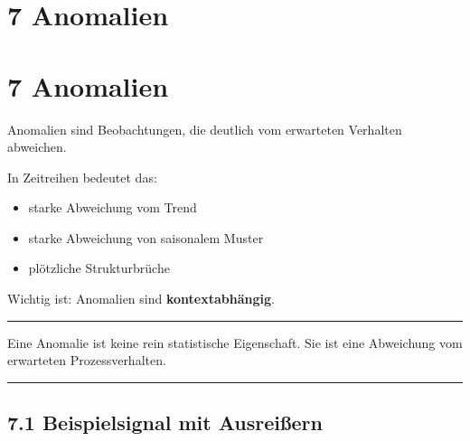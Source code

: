 \documentclass[
  ngerman,
  letterpaper,
  DIV=11]{scrreprt}
\providecommand{\tightlist}{%
  \setlength{\itemsep}{0pt}\setlength{\parskip}{0pt}}
\begin{document}

\chapter{7 Anomalien}\label{anomalien}


\chapter{7 Anomalien}\label{anomalien-1}

Anomalien sind Beobachtungen, die deutlich vom erwarteten Verhalten
abweichen.

In Zeitreihen bedeutet das:

\begin{itemize}
\tightlist
\item
  starke Abweichung vom Trend
\item
  starke Abweichung von saisonalem Muster
\item
  plötzliche Strukturbrüche
\end{itemize}

Wichtig ist: Anomalien sind \textbf{kontextabhängig}.

\begin{center}\rule{0.5\linewidth}{0.5pt}\end{center}

\begin{tcolorbox}[enhanced jigsaw, titlerule=0mm, title=\textcolor{quarto-callout-note-color}{\faInfo}\hspace{0.5em}{Merke}, bottomrule=.15mm, opacityback=0, colbacktitle=quarto-callout-note-color!10!white, coltitle=black, opacitybacktitle=0.6, colframe=quarto-callout-note-color-frame, toprule=.15mm, leftrule=.75mm, arc=.35mm, rightrule=.15mm, breakable, bottomtitle=1mm, colback=white, toptitle=1mm, left=2mm]

Eine Anomalie ist keine rein statistische Eigenschaft. Sie ist eine
Abweichung vom erwarteten Prozessverhalten.

\end{tcolorbox}

\begin{center}\rule{0.5\linewidth}{0.5pt}\end{center}

\section{7.1 Beispielsignal mit
Ausreißern}\label{beispielsignal-mit-ausreiuxdfern}
\end{document}
